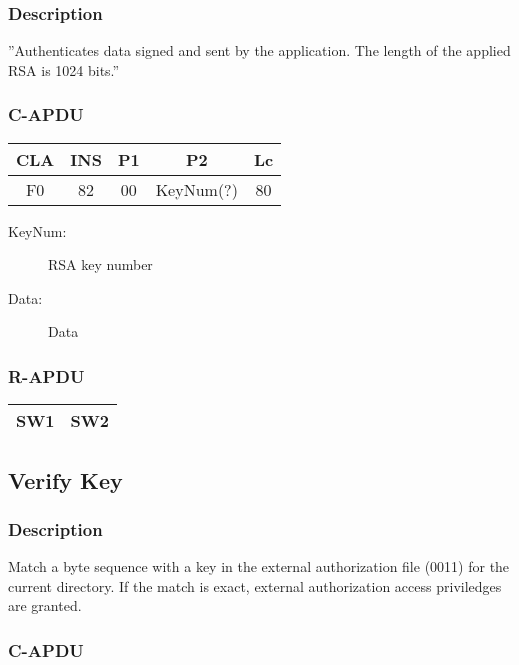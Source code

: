 \documentclass[a4paper,oneside]{article}
\begin{document}
\subsubsection*{Description}

''Authenticates data signed and sent by the application. The length
of the applied RSA is 1024 bits.''

\subsubsection*{C-APDU}

\begin{tabular}{|c|c|c|c|c|} \hline
CLA & INS & P1 & P2 & Lc \\ \hline \hline
F0 & 82 & 00 & KeyNum(?) & 80 \\ \hline
\end{tabular}

\begin{description}
\item[KeyNum:] RSA key number
\item[Data:] Data
\end{description}

\subsubsection*{R-APDU}

\begin{tabular}{|c|c|} \hline
SW1 & SW2 \\ \hline
\end{tabular}


\subsection{Verify Key}

\subsubsection*{Description}

Match a byte sequence with a key in the external authorization file
(0011) for the current directory. If the match is exact, external
authorization access priviledges are granted.

\subsubsection*{C-APDU}
\end{document}
